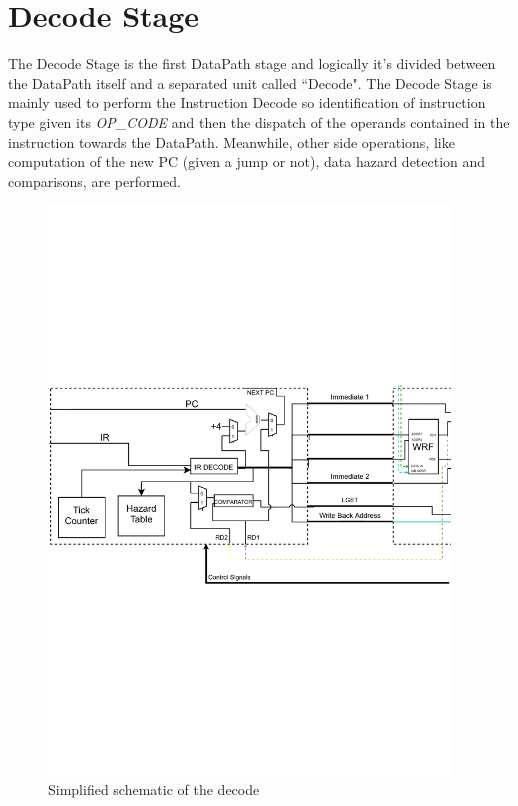 \chapter{Decode Stage}
\label{sec:decode_stage}

The Decode Stage is the first DataPath stage and logically it's divided between the DataPath itself and a separated unit called ``Decode". The Decode Stage is mainly used to perform the Instruction Decode so identification of instruction type given its \emph{OP\_CODE} and then the dispatch of the operands contained in the instruction towards the DataPath. Meanwhile, other side operations, like computation of the new PC (given a jump or not), data hazard detection and comparisons, are performed.

\begin{figure}[H]
  \centering
  \includegraphics[width=0.95\textwidth]{chapters/4_DecodeStage/images/Decode_stage_focus.pdf}
  \caption{Simplified schematic of the decode}
  \label{decode_block_focus}
\end{figure}

